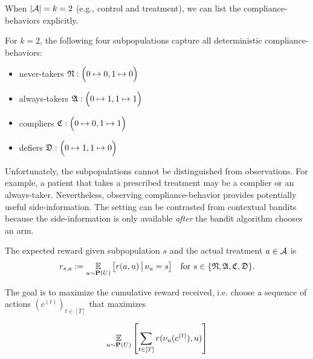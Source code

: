 When $|{\mathcal A}|=k=2$ (e.g., control and treatment), we can list the compliance-behaviors explicitly.
\begin{defn}\label{def:compliance_model}\eod
	For $k=2$, the following four subpopulations capture all deterministic compliance-behaviors:
	\begin{itemize}
		\item never-takers ${\mathfrak N}: \Big(0\mapsto 0, 1\mapsto 0\Big)$
		\item always-takers ${\mathfrak A}: \Big(0\mapsto 1, 1\mapsto 1\Big)$
		\item compliers ${\mathfrak C}: \Big( 0\mapsto 0, 1\mapsto 1\Big)$
		\item defiers ${\mathfrak D}: \Big(0\mapsto 1, 1\mapsto 0\Big)$
	\end{itemize}
\end{defn}

Unfortunately, the subpopulations cannot be distinguished from observations. For example, a patient that takes a prescribed treatment may be a complier or an always-taker. Nevertheless, observing compliance-behavior provides potentially useful side-information. The setting can be contrasted from contextual bandits because the side-information is only available \emph{after} the bandit algorithm chooses an arm.

\begin{defn}\label{def:reward_model}\eod
	The expected reward given subpopulation $s$ and the actual treatment $a\in{\mathcal A}$ is
	\begin{equation}
		r_{s,a} 
		:= \operatorname*{\mathbb E}_{u\sim {\mathbf P}(U)}\big[r(a,u)\,\big|\, \nu_u=s\big]
		\quad\text{for }s\in \{{\mathfrak N}, {\mathfrak A},{\mathfrak C},{\mathfrak D}\}.
		\label{eq:exp_rew}		
	\end{equation}		
\end{defn}

The goal is to maximize the cumulative reward received, i.e. choose a sequence of actions $(c^{(t)})_{t\in [T]}$ that maximizes 

\begin{equation}
   \operatorname*{\mathbb E}_{u\sim {\mathbf P}(U)}\left[\sum_{t\in[T]}r(\nu_u(c^{(t)}), u)\right]
\end{equation}

